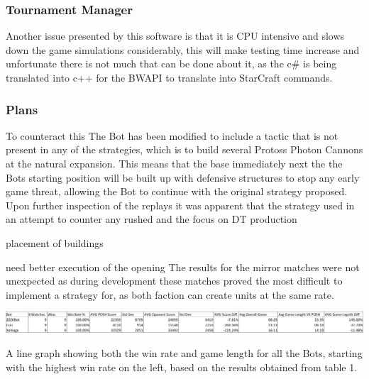 \documentclass[journal]{IEEEtran}
\begin{document}
\subsubsection{Tournament Manager}
Another issue presented by this software is that it is CPU intensive and slows down the game simulations considerably, this will make testing time increase and unfortunate there is not much that can be done about it, as the c\# is being translated into c++ for the BWAPI to translate into StarCraft commands.

\subsubsection{Plans}
To counteract this The Bot has been modified to include a tactic that is not present in any of the strategies, which is to build several Protoss Photon Cannons at the natural expansion. This means that the base immediately next the the Bots starting position will be built up with defensive structures to stop any early game threat, allowing the Bot to continue with the original strategy proposed.
Upon further inspection of the replays it was apparent that the strategy used in an attempt to counter any rushed and the focus on DT production

placement of buildings

need better execution of the opening
The results for the mirror matches were not unexpected as during development these matches proved the most difficult to implement a strategy for, as both faction can create units at the same rate.
\begin{table}
	\centering
	\includegraphics[width=\textwidth]{PvsBots}
	\caption{A line graph showing both the win rate and game length for all the Bots, starting with the highest win rate on the left, based on the results obtained from table 1.}
	\label{Table6}
\end{table}
\end{document}
